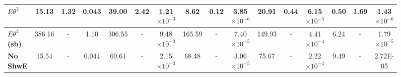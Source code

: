\begin{sidewaysfigure}[!hb]
\begin{scriptsize}
\begin{tabular}{|l|ccc|ccc|ccc|ccc|ccc|}
\textbf{$E\theta^2$}      & 15.13              & 1.32                                                                & 0.043                                      & 39.00                & 2.42                                                                  & 1.21$\times 10^{-3}$                                     & 8.62                  & 0.12                                                                   & 3.85$\times 10^{-6}$                                      & 20.91             & 0.44                                                               & 6.15$\times 10^{-5}$                                  & 0.50                 & 1.69                                                                  & 1.43$\times 10^{-6}$                                  \\\hline\hline
\textbf{$E\theta^2$ (sb)}  & 386.16             & -                                                            & 1.10                                       & 306.55               & -                                                                & 9.48$\times 10^{-3}$                                     & 165.59                & -                                                               & 7.40$\times 10^{-5}$                                      & 149.93            & -                                                             & 4.41$\times 10^{-4}$                                  & 6.24                 & -                                                              & 1.79$\times 10^{-5}$                                     \\\hline\hline
\textbf{No ShwE}  & 15.54              & -                                                                & 0.044                                      & 69.61                & -                                                                 & 2.15$\times 10^{-3}$                                     & 68.48                 & - & 3.06$\times 10^{-5}$                                      & 75.67             & - & 2.22$\times 10^{-4}$                                  & 9.49                 & -                                                                & 2.72E-05   \\\hline
\end{tabular}

\label{tab:CutflowTableBackground}
\end{scriptsize}
\end{sidewaysfigure}

